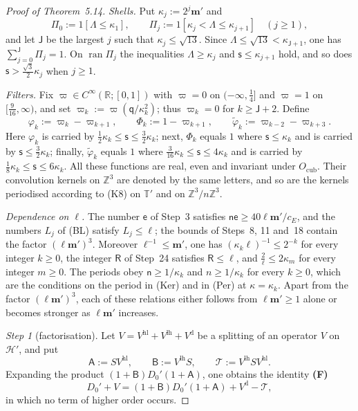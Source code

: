 \documentclass[11pt,letterpaper,reqno]{amsart}
\theoremstyle{definition}
\begin{document}
\begin{proof}[Proof of Theorem~5.14]
\emph{Shells.}
Put $\kappa_j:=2^j\mathbf m'$ and
\begin{equation*}
\Pi_0:=1[\Lambda\le\kappa_1],\qquad\Pi_j:=1[\kappa_j<\Lambda\le\kappa_{j+1}]\quad(j\ge1),
\end{equation*}
and let $\mathsf J$ be the largest $j$ such that $\kappa_j\le\sqrt{13}$.
Since $\Lambda\le\sqrt{13}<\kappa_{\mathsf J+1}$, one has $\sum_{j=0}^{\mathsf J}\Pi_j=1$.
On $\operatorname{ran}\Pi_j$ the inequalities $\Lambda\ge\kappa_j$ and $\mathsf s\le\kappa_{j+1}$ hold, and so does $\mathsf s>\frac{\sqrt3}{2}\kappa_j$ when $j\ge1$.

\emph{Filters.}
Fix $\varpi\in C^\infty(\mathbb R;[0,1])$ with $\varpi=0$ on $(-\infty,\frac14]$ and $\varpi=1$ on $[\frac9{16},\infty)$, and set $\varpi_k:=\varpi(\mathsf q/\kappa_k^2)$;
thus $\varpi_k=0$ for $k\ge\mathsf J+2$.
Define
\begin{equation*}
\varphi_k:=\varpi_k-\varpi_{k+1},\qquad\Phi_k:=1-\varpi_{k+1},\qquad\tilde\varphi_k:=\varpi_{k-2}-\varpi_{k+3}.
\end{equation*}
Here $\varphi_k$ is carried by $\frac12\kappa_k\le\mathsf s\le\frac32\kappa_k$;
next, $\Phi_k$ equals $1$ where $\mathsf s\le\kappa_k$ and is carried by $\mathsf s\le\frac32\kappa_k$;
finally, $\tilde\varphi_k$ equals $1$ where $\frac3{16}\kappa_k\le\mathsf s\le4\kappa_k$ and is carried by $\frac18\kappa_k\le\mathsf s\le6\kappa_k$.
All these functions are real, even and invariant under $O_{\mathrm{cub}}$.
Their convolution kernels on $\mathbb Z^3$ are denoted by the same letters, and so are the kernels periodised according to (K8) on $\mathbb T'$ and on $\mathbb Z^3/n\mathbb Z^3$.

\emph{Dependence on $\ell$.}
The number $\mathsf e$ of Step~3 satisfies $\mathsf n\mathsf e\ge40\ell\mathbf m'/c_E$, and the numbers $L_j$ of (BL) satisfy $L_j\le\ell$;
the bounds of Steps~8, 11 and~18 contain the factor $(\ell\mathbf m')^3$.
Moreover $\ell^{-1}\le\mathbf m'$, one has $(\kappa_k\ell)^{-1}\le2^{-k}$ for every integer $k\ge0$, the integer $\mathsf R$ of Step~24 satisfies $\mathsf R\le\ell$, and $\frac2\ell\le2\kappa_m$ for every integer $m\ge0$.
The periods obey $\mathsf n\ge1/\kappa_k$ and $n\ge1/\kappa_k$ for every $k\ge0$, which are the conditions on the period in (Ker) and in (Per) at $\kappa=\kappa_k$.
Apart from the factor $(\ell\mathbf m')^3$, each of these relations either follows from $\ell\mathbf m'\ge1$ alone or becomes stronger as $\ell\mathbf m'$ increases.

\emph{Step 1} (factorisation).
Let $V=V^{\mathrm{hl}}+V^{\mathrm{lh}}+V^{\mathrm d}$ be a splitting of an operator $V$ on $\mathcal H'$, and put
\begin{equation*}
\mathsf A:=SV^{\mathrm{hl}},\qquad\mathsf B:=V^{\mathrm{lh}}S,\qquad\mathcal T:=V^{\mathrm{lh}}SV^{\mathrm{hl}}.
\end{equation*}
Expanding the product $(1+\mathsf B)D_0'(1+\mathsf A)$, one obtains the identity \textbf{(F)}
\begin{equation}
\tag{F}
D_0'+V=(1+\mathsf B)D_0'(1+\mathsf A)+V^{\mathrm d}-\mathcal T,
\end{equation}
in which no term of higher order occurs.


\end{proof}
\end{document}
